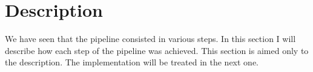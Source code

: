 \documentclass{standalone}
\begin{document}
\section{Description}
We have seen that the pipeline consisted in various steps.
In this section I will describe how each step of the pipeline was achieved.
This section is aimed only to the description.
The implementation will be treated in the next one.
\end{document}
